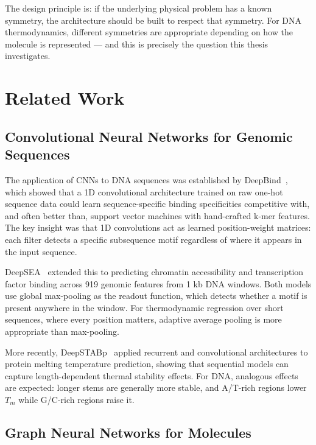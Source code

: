 \documentclass[12pt,oneside,letterpaper]{report}
\begin{document}
The design principle is: if the underlying physical problem has a known symmetry, the architecture should be built to respect that symmetry. For DNA thermodynamics, different symmetries are appropriate depending on how the molecule is represented --- and this is precisely the question this thesis investigates.

\chapter{Related Work}

\section{Convolutional Neural Networks for Genomic Sequences}

The application of CNNs to DNA sequences was established by DeepBind~\cite{alipanahi2015}, which showed that a 1D convolutional architecture trained on raw one-hot sequence data could learn sequence-specific binding specificities competitive with, and often better than, support vector machines with hand-crafted k-mer features. The key insight was that 1D convolutions act as learned position-weight matrices: each filter detects a specific subsequence motif regardless of where it appears in the input sequence.

DeepSEA~\cite{zhou2015} extended this to predicting chromatin accessibility and transcription factor binding across 919 genomic features from 1 kb DNA windows. Both models use global max-pooling as the readout function, which detects whether a motif is present anywhere in the window. For thermodynamic regression over short sequences, where every position matters, adaptive average pooling is more appropriate than max-pooling.

More recently, DeepSTABp~\cite{deepstabp} applied recurrent and convolutional architectures to protein melting temperature prediction, showing that sequential models can capture length-dependent thermal stability effects. For DNA, analogous effects are expected: longer stems are generally more stable, and A/T-rich regions lower $T_m$ while G/C-rich regions raise it.

\section{Graph Neural Networks for Molecules}
\end{document}
